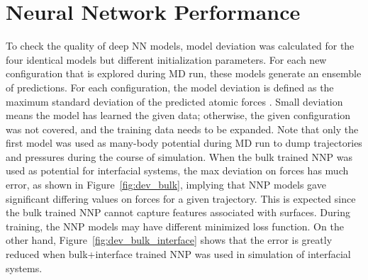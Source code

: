 \section{Neural Network Performance}
To check the quality of deep NN models, model deviation was calculated for the
four identical models but different initialization parameters. For each
new configuration that is explored during MD run, these models
generate an ensemble of predictions. For each configuration,
the model deviation is defined as the maximum standard deviation of the
predicted atomic forces \cite{zhang2019active,zeng2023deepmd}.  Small deviation means the model has learned the given data; otherwise, the given configuration was not covered, and the training data needs to be expanded. Note that  only the  first
model was used as many-body potential during MD run to dump trajectories and
pressures during the course of simulation. When the bulk trained NNP was
used as potential for interfacial systems, the max deviation on forces has much
error, as shown in Figure~\ref{fig:dev_bulk}, implying that NNP models gave
significant differing values on forces for
a given trajectory. This is expected since the bulk trained NNP cannot
capture features associated with surfaces. During training, the NNP models may
have different minimized loss function. On the other hand,
Figure~\ref{fig:dev_bulk_interface} shows that the error is greatly reduced
when bulk+interface trained NNP was used in simulation of interfacial systems.

